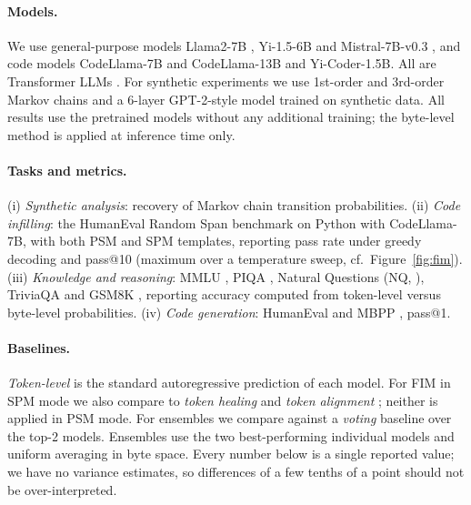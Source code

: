 \documentclass{article} %
\begin{document}
\paragraph{Models.}
We use general-purpose models Llama2-7B \citep{touvron2023llama2}, Yi-1.5-6B \citep{young2024yi} and Mistral-7B-v0.3 \citep{jiang2023mistral}, and code models CodeLlama-7B and CodeLlama-13B \citep{roziere2023codellama} and Yi-Coder-1.5B. All are Transformer LLMs \citep{vaswani2017attention}. For synthetic experiments we use 1st-order and 3rd-order Markov chains and a 6-layer GPT-2-style model \citep{radford2019gpt2} trained on synthetic data. All results use the pretrained models without any additional training; the byte-level method is applied at inference time only.

\paragraph{Tasks and metrics.}
(i) \emph{Synthetic analysis}: recovery of Markov chain transition probabilities. (ii) \emph{Code infilling}: the HumanEval Random Span benchmark \citep{bavarian2022fim} on Python with CodeLlama-7B, with both PSM and SPM templates, reporting pass rate under greedy decoding and pass@10 (maximum over a temperature sweep, cf.\ Figure~\ref{fig:fim}). (iii) \emph{Knowledge and reasoning}: MMLU \citep{hendrycks2021mmlu}, PIQA \citep{bisk2020piqa}, Natural Questions (NQ, \citealp{kwiatkowski2019nq}), TriviaQA \citep{joshi2017triviaqa} and GSM8K \citep{cobbe2021gsm8k}, reporting accuracy computed from token-level versus byte-level probabilities. (iv) \emph{Code generation}: HumanEval \citep{chen2021humaneval} and MBPP \citep{austin2021mbpp}, pass@1.

\paragraph{Baselines.}
\emph{Token-level} is the standard autoregressive prediction of each model. For FIM in SPM mode we also compare to \emph{token healing} \citep{dagan2024getting} and \emph{token alignment} \citep{athiwaratkun2024token}; neither is applied in PSM mode. For ensembles we compare against a \emph{voting} baseline over the top-2 models. Ensembles use the two best-performing individual models and uniform averaging in byte space. Every number below is a single reported value; we have no variance estimates, so differences of a few tenths of a point should not be over-interpreted.
\end{document}

